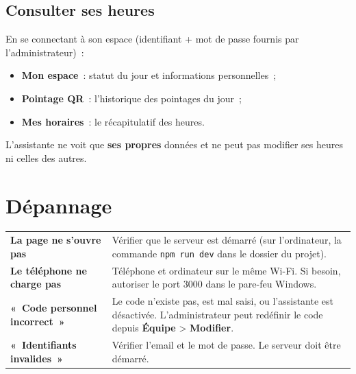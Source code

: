 \documentclass[11pt,a4paper]{article}
\newcommand{\menu}[1]{\textbf{\textcolor{faraday}{#1}}}
\begin{document}
\subsection{Consulter ses heures}
En se connectant à son espace (identifiant + mot de passe fournis par l'administrateur)~:
\begin{itemize}[leftmargin=1.4em]
  \item \menu{Mon espace}~: statut du jour et informations personnelles~;
  \item \menu{Pointage QR}~: l'historique des pointages du jour~;
  \item \menu{Mes horaires}~: le récapitulatif des heures.
\end{itemize}
L'assistante ne voit que \textbf{ses propres} données et ne peut pas modifier ses heures ni celles des autres.

\newpage

\section{Dépannage}

\begin{tabular}{>{\bfseries}p{5.2cm} p{9cm}}
\toprule
La page ne s'ouvre pas & Vérifier que le serveur est démarré (sur l'ordinateur, la commande \texttt{npm run dev} dans le dossier du projet). \\
\addlinespace
Le téléphone ne charge pas & Téléphone et ordinateur sur le même Wi-Fi. Si besoin, autoriser le port 3000 dans le pare-feu Windows. \\
\addlinespace
«~Code personnel incorrect~» & Le code n'existe pas, est mal saisi, ou l'assistante est désactivée. L'administrateur peut redéfinir le code depuis \menu{Équipe} > \menu{Modifier}. \\
\addlinespace
«~Identifiants invalides~» & Vérifier l'email et le mot de passe. Le serveur doit être démarré. \\
\bottomrule
\end{tabular}

\end{document}
